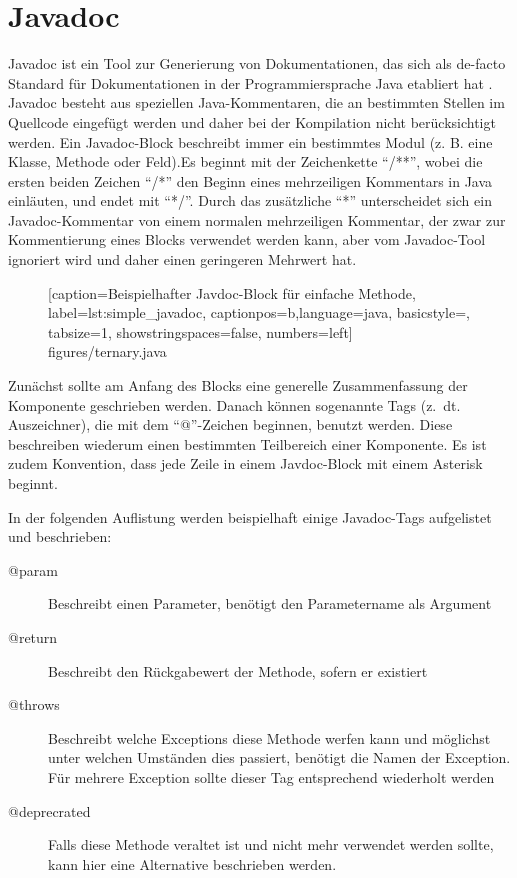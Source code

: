 \section{Javadoc}\label{chapter:javadoc}
Javadoc \cite{HowtoWriteDocCommentsfortheJavadocTool} ist ein Tool zur Generierung von Dokumentationen, das sich als de-facto Standard für Dokumentationen in der Programmiersprache Java etabliert hat \cite[S. 249]{JavadocViolationsandTheirEvolutioninOpen-SourceSoftware}.  Javadoc besteht aus speziellen Java-Kommentaren, die an bestimmten Stellen im Quellcode eingefügt werden und daher bei der Kompilation nicht berücksichtigt werden. Ein Javadoc-Block beschreibt immer ein bestimmtes Modul (z. B. eine Klasse, Methode oder Feld).Es beginnt mit der Zeichenkette \enquote{/**}, wobei die ersten beiden Zeichen \enquote{/*} den Beginn eines mehrzeiligen Kommentars in Java einläuten, und endet mit \enquote{*/}. Durch das zusätzliche \enquote{*} unterscheidet sich ein Javadoc-Kommentar von einem normalen mehrzeiligen Kommentar, der zwar zur Kommentierung eines Blocks verwendet werden kann, aber vom Javadoc-Tool ignoriert wird und daher einen geringeren Mehrwert hat.
		\begin{figure}[ht!]
			
			[caption={Beispielhafter Javdoc-Block für einfache Methode},
			label={lst:simple_javadoc},
			captionpos=b,language=java, basicstyle=\footnotesize, tabsize=1, showstringspaces=false,  numbers=left]
			{figures/ternary.java}
		\end{figure}
Zunächst sollte am Anfang des Blocks eine generelle Zusammenfassung der Komponente geschrieben werden. Danach können sogenannte Tags (z.~dt. Auszeichner), die mit dem \enquote{@}-Zeichen beginnen, benutzt werden. Diese beschreiben wiederum einen bestimmten Teilbereich einer Komponente. Es ist zudem Konvention, dass jede Zeile in einem Javdoc-Block mit einem Asterisk beginnt. 

In der folgenden Auflistung werden beispielhaft einige Javadoc-Tags aufgelistet und beschrieben:
\begin{description}
         \item[@param]  Beschreibt einen Parameter, benötigt den Parametername als Argument
         \item[@return]  Beschreibt den Rückgabewert der Methode, sofern er existiert 
         \item[@throws] Beschreibt welche Exceptions diese Methode werfen kann und möglichst unter welchen Umständen dies passiert, benötigt die Namen der Exception. Für mehrere Exception sollte dieser Tag entsprechend wiederholt werden 
         \item[@deprecrated] Falls diese Methode veraltet ist und nicht mehr verwendet werden sollte, kann hier eine Alternative beschrieben werden. 
        
\end{description}

